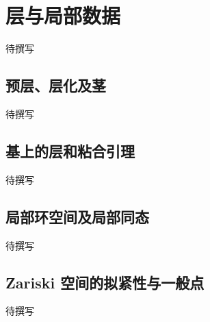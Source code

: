 
% 
% 

\section{层与局部数据}
\label{g5:sec:1001}

待撰写

\subsection{预层、层化及茎}
\label{g5:subsec:1001:01}
待撰写

\subsection{基上的层和粘合引理}
\label{g5:subsec:1001:02}
待撰写

\subsection{局部环空间及局部同态}
\label{g5:subsec:1001:03}
待撰写

\subsection{Zariski 空间的拟紧性与一般点}
\label{g5:subsec:1001:04}
待撰写
